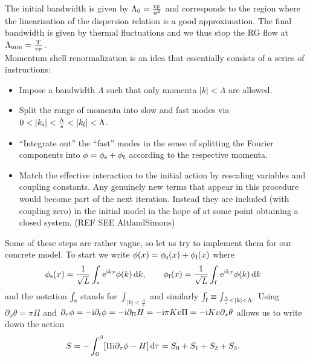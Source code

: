 \documentclass[english, parskip=full]{scrartcl}
\begin{document}
The initial bandwidth is given by $\Lambda_0 = \frac{v_{\text{F}}}{a^2}$ and corresponds to the region where the linearization of the dispersion relation is a good approximation.
The final bandwidth is given by thermal fluctuations and we thus stop the RG flow at $\Lambda_{\text{min}} = \frac{T}{v_{\text{F}}}$.\\
Momentum shell renormalization is an idea that essentially consists of a series of instructions:
\begin{itemize}
\item[1.] Impose a bandwidth $\Lambda$ such that only momenta $|k|<\Lambda$ are allowed.
\item[2.] Split the range of momenta into slow and fast modes via $0<|k_\s| < \frac{\Lambda}{s} < |k_\f| < \Lambda$.
\item[3.] ``Integrate out'' the ``fast'' modes in the sense of splitting the Fourier components into $\phi = \phi_{\text{s}} + \phi_{\text{f}}$ according to the respective momenta.
\item[4.] Match the effective interaction to the initial action by rescaling variables and coupling constants. Any genuinely new terms that appear in this procedure would become part of the next iteration.
Instead they are included (with coupling zero) in the initial model in the hope of at some point obtaining a closed system. (REF SEE AltlandSimons)
\end{itemize}
Some of these steps are rather vague, so let us try to implement them for our concrete model.
To start we write $\phi(x) = \phi_{\text{s}}(x) + \phi_{\text{f}}(x)$ where 
\begin{align}
\phi_{\text{s}}(x) &= \frac{1}{\sqrt{L}} \int_{\text{s}}^{ }  \text{e}^{\text{i} kx} \phi(k) \,\mathrm{d}k,\qquad \phi_{\text{f}}(x) = \frac{1}{\sqrt{L}} \int_{\text{f}}^{ }  \text{e}^{\text{i} kx} \phi(k) \,\mathrm{d}k
\end{align}
and the notation $\int_{\text{s}}$ stands for $\int_{|k| < \frac{\Lambda}{s}}$ and similarly $\int_\f \equiv \int_{\frac{\Lambda}{s}<|k|<\Lambda}$.
Using $\partial_x\theta = \pi \Pi$ and $\partial_\tau \phi = -\text{i}\partial_t\phi = -\text{i}\partial_\Pi H = -\text{i} \pi Kv\Pi = -\text{i} Kv \partial_x\theta$ allows us to write down the action
\begin{align}
S &= -\intx{0}{\beta}{\klb*{\Pi \i\partial_\tau \phi - H}}{\tau} = S_0 + S_1 + S_2 + S_3.
\end{align}
\end{document}
